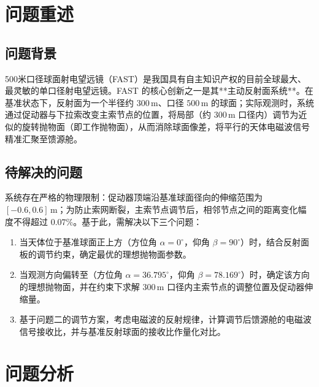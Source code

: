 \documentclass[UTF8,a4paper,zihao=-4]{ctexart}
\begin{document}
\newpage
\setcounter{page}{1}

\section{问题重述}

\subsection{问题背景}
500米口径球面射电望远镜（FAST）是我国具有自主知识产权的目前全球最大、最灵敏的单口径射电望远镜。FAST 的核心创新之一是其**主动反射面系统**。在基准状态下，反射面为一个半径约 $300\,\mathrm{m}$、口径 $500\,\mathrm{m}$ 的球面；实际观测时，系统通过促动器与下拉索改变主索节点的位置，将局部（约 $300\,\mathrm{m}$ 口径内）调节为近似的旋转抛物面（即工作抛物面），从而消除球面像差，将平行的天体电磁波信号精准汇聚至馈源舱。

\subsection{待解决的问题}
系统存在严格的物理限制：促动器顶端沿基准球面径向的伸缩范围为 $[-0.6, 0.6]\,\mathrm{m}$；为防止索网断裂，主索节点调节后，相邻节点之间的距离变化幅度不得超过 $0.07\%$。基于此，需解决以下三个问题：

\begin{enumerate}[label=(\arabic*), itemsep=0.3em]
    \item 当天体位于基准球面正上方（方位角 $\alpha=0^\circ$，仰角 $\beta=90^\circ$）时，结合反射面板的调节约束，确定最优的理想抛物面参数。
    \item 当观测方向偏转至（方位角 $\alpha=36.795^\circ$，仰角 $\beta=78.169^\circ$）时，确定该方向的理想抛物面，并在约束下求解 $300\,\mathrm{m}$ 口径内主索节点的调整位置及促动器伸缩量。
    \item 基于问题二的调节方案，考虑电磁波的反射规律，计算调节后馈源舱的电磁波信号接收比，并与基准反射球面的接收比作量化对比。
\end{enumerate}

\section{问题分析}
\end{document}
